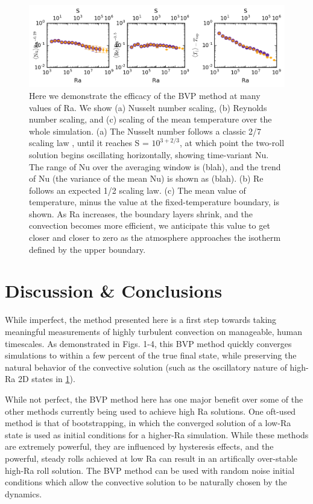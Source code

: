 \documentclass[aps, pre, onecolumn, nofootinbib, notitlepage, groupedaddress, amsfonts, amssymb, amsmath, longbibliography]{revtex4-1}
\begin{document}
\begin{figure}[t]
\includegraphics[width=\textwidth]{./figs/parameter_space_comparison.png}
\caption{Here we demonstrate the efficacy of the BVP method at many values of Ra.  We show
(a) Nusselt number scaling, (b) Reynolds number scaling, and (c) scaling of the mean temperature
over the whole simulation.  (a) The Nusselt number follows a classic 2/7 scaling law
\cite{johnston&doering2009}, until it reaches S = $10^{3 + 2/3}$, at which point the
two-roll solution begins oscillating horizontally, showing time-variant Nu.  The range of Nu
over the averaging window is (blah), and the trend of Nu (the variance of the mean Nu) is shown
as (blah).  (b) Re follows an expected 1/2 scaling law. (c) The mean value of temperature, minus
the value at the fixed-temperature boundary, is shown.  As Ra increases, the boundary layers shrink,
and the convection becomes more efficient, we anticipate this value to get closer and closer to
zero as the atmosphere approaches the isotherm defined by the upper boundary.
\label{fig:parameter_space_comparison} }
\end{figure}



\section{Discussion \& Conclusions}
\label{sec:results}
While imperfect, the method presented here is a first step towards taking meaningful measurements
of highly turbulent convection on manageable, human timescales.  As demonstrated in Figs.
1-4, this BVP method quickly converges simulations to within a few percent of the true final
state, while preserving the natural behavior of the convective solution (such as the oscillatory
nature of high-Ra 2D states in \ref{fig:parameter_space_comparison}).  

While not perfect, the BVP method here has one major benefit over some of the other methods
currently being used to achieve high Ra solutions.  One oft-used method is that of bootstrapping,
in which the converged solution of a low-Ra state is used as initial conditions for a higher-Ra
simulation.  While these methods are extremely powerful, they are influenced by hysteresis effects,
and the powerful, steady rolls achieved at low Ra can result in an artifically over-stable high-Ra
roll solution.  The BVP method can be used with random noise initial conditions which allow the
convective solution to be naturally chosen by the dynamics.
\end{document}
